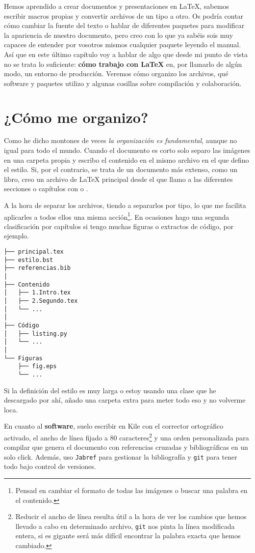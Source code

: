 Hemos aprendido a crear documentos y presentaciones en LaTeX, sabemos
escribir macros propias y convertir archivos de un tipo a otro. Os
podría contar cómo cambiar la fuente del texto o hablar de diferentes
paquetes para modificar la apariencia de nuestro documento, pero creo
con lo que ya sabéis sois muy capaces de entender por vosotros mismos
cualquier paquete leyendo el manual. Así que en este último capítulo voy
a hablar de algo que desde mi punto de vista no se trata lo suficiente:
\textbf{cómo trabajo con LaTeX} en, por llamarlo de algún modo, un
entorno de producción. Veremos cómo organizo los archivos, qué software
y paquetes utilizo y algunas cosillas sobre compilación y colaboración.

\section{¿Cómo me organizo?}

Como he dicho montones de veces \emph{la organización es fundamental},
aunque no igual para todo el mundo. Cuando el documento es corto solo
separo las imágenes en una carpeta propia y escribo el contenido en el
mismo archivo en el que defino el estilo. Si, por el contrario, se trata
de un documento más extenso, como un libro, creo un archivo de LaTeX
principal desde el que llamo a las diferentes secciones o capítulos con
\lstinline!! o \lstinline!!.

A la hora de separar los archivos, tiendo a separarlos por tipo, lo que
me facilita aplicarles a todos ellos una misma acción\footnote{Pensad en
  cambiar el formato de todas las imágenes o buscar una palabra en el
  contenido.}. En ocasiones hago una segunda clasificación por capítulos
si tengo muchas figuras o extractos de código, por ejemplo.

\begin{lstlisting}
├── principal.tex
├── estilo.bst
├── referencias.bib
│
├── Contenido
│   ├── 1.Intro.tex
│   ├── 2.Segundo.tex
│   └── ...
│
├── Código
│   ├── listing.py
│   └── ...
│
└── Figuras
    ├── fig.eps
    └── ...
\end{lstlisting}

Si la definición del estilo es muy larga o estoy usando una clase que he
descargado por ahí, añado una carpeta extra para meter todo eso y no
volverme loca.

En cuanto al \textbf{software}, suelo escribir en Kile con el corrector
ortográfico activado, el ancho de línea fijado a 80 caracteres\footnote{Reducir
  el ancho de línea resulta útil a la hora de ver los cambios que hemos
  llevado a cabo en determinado archivo, \lstinline!git! nos pinta la
  línea modificada entera, si es gigante será más difícil encontrar la
  palabra exacta que hemos cambiado.} y una orden personalizada para
compilar que genera el documento con referencias cruzadas y
bibliográficas en un solo click. Además, uso \lstinline!Jabref! para
gestionar la bibliografía y \lstinline!git! para tener todo bajo control
de versiones.

